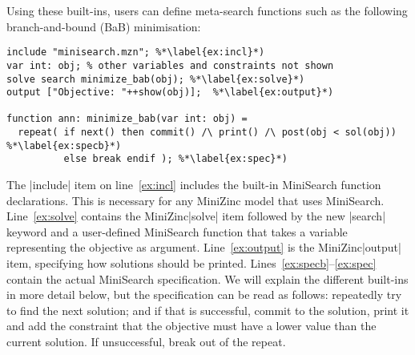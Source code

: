 \documentclass[a4paper,13pt,onecolumn]{article}%
\newcommand{\MiniZinc}{\mbox{\sc MiniZinc}\xspace}
\newcommand{\MiniSearch}{\mbox{\sc MiniSearch}\xspace}
\begin{document}
Using these built-ins, users can define meta-search functions such as the following branch-and-bound (BaB) minimisation:
\begin{lstlisting}
include "minisearch.mzn"; %*\label{ex:incl}*)
var int: obj; % other variables and constraints not shown
solve search minimize_bab(obj); %*\label{ex:solve}*)
output ["Objective: "++show(obj)];  %*\label{ex:output}*)

function ann: minimize_bab(var int: obj) =
  repeat( if next() then commit() /\ print() /\ post(obj < sol(obj)) %*\label{ex:specb}*)
          else break endif ); %*\label{ex:spec}*)
\end{lstlisting}
The \mzninline|include| item on line~\ref{ex:incl} includes the built-in
\MiniSearch function declarations. This is necessary for any \MiniZinc model that uses \MiniSearch.
Line~\ref{ex:solve} contains the \MiniZinc \mzninline|solve|
item followed by the new \mzninline|search| keyword and a user-defined \MiniSearch function that
takes a variable representing the objective as argument. Line~\ref{ex:output} is the
\MiniZinc \mzninline|output| item, specifying how solutions should be
printed. Lines~\ref{ex:specb}--\ref{ex:spec} contain the actual \MiniSearch specification. We will explain the different built-ins in more detail below, but the specification can be read as follows: repeatedly try to find the next solution; and if that is successful, 
commit to the solution, print it and add the constraint that the objective must have a lower value than the current solution.
If unsuccessful, break out of the repeat.
\end{document}
